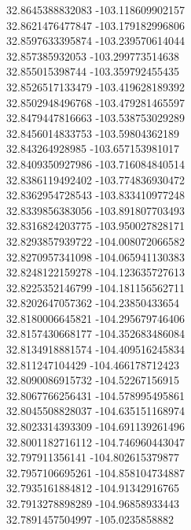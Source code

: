 {32.8645388832083	-103.118609902157\\
32.8621476477847	-103.179182996806\\
32.8597633395874	-103.239570614044\\
32.857385932053	-103.299773514638\\
32.855015398744	-103.359792455435\\
32.8526517133479	-103.419628189392\\
32.8502948496768	-103.479281465597\\
32.8479447816663	-103.538753029289\\
32.8456014833753	-103.59804362189\\
32.843264928985	-103.657153981017\\
32.8409350927986	-103.716084840514\\
32.8386119492402	-103.774836930472\\
32.8362954728543	-103.833410977248\\
32.8339856383056	-103.891807703493\\
32.8316824203775	-103.950027828171\\
32.8293857939722	-104.008072066582\\
32.8270957341098	-104.065941130383\\
32.8248122159278	-104.123635727613\\
32.8225352146799	-104.181156562711\\
32.8202647057362	-104.23850433654\\
32.8180006645821	-104.295679746406\\
32.8157430668177	-104.352683486084\\
32.8134918881574	-104.409516245834\\
32.811247104429	-104.466178712423\\
32.8090086915732	-104.52267156915\\
32.8067766256431	-104.578995495861\\
32.8045508828037	-104.635151168974\\
32.8023314393309	-104.691139261496\\
32.8001182716112	-104.746960443047\\
32.797911356141	-104.802615379877\\
32.7957106695261	-104.858104734887\\
32.7935161884812	-104.91342916765\\
32.7913278898289	-104.96858933443\\
32.7891457504997	-105.0235858882\\
}
